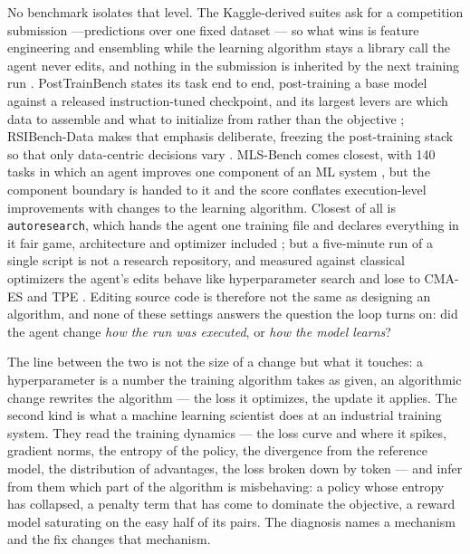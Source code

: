 No benchmark isolates that level. The Kaggle-derived suites ask for a competition submission ---predictions over one fixed dataset --- so what wins is feature engineering and ensembling while the
learning algorithm stays a library call the agent never edits, and nothing in the submission is
inherited by the next training run \citep{chan2024mlebench,qiang2025mledojo}. PostTrainBench states
its task end to end, post-training a base model against a released instruction-tuned checkpoint, and
its largest levers are which data to assemble and what to initialize from rather than the objective
\citep{rank2026posttrainbench}; RSIBench-Data makes that emphasis deliberate, freezing the
post-training stack so that only data-centric decisions vary \citep{meng2026rsibench}. MLS-Bench
comes closest, with 140 tasks in which an agent improves one component of an ML system
\citep{lyu2026mlsbench}, but the component boundary is handed to it and the score conflates execution-level improvements with changes to the learning algorithm.
Closest of all is
\texttt{autoresearch}, which hands the agent one training file and declares everything in it fair
game, architecture and optimizer included \citep{karpathy2026autoresearch}; but a five-minute run of a single script is not a research repository, and measured against classical optimizers the agent's
edits behave like hyperparameter search and lose to CMA-ES and TPE \citep{ferreira2026autoresearch}. Editing source code is therefore not
the same as designing an algorithm, and none of these settings answers the question the loop turns
on: did the agent change \emph{how the run was executed}, or \emph{how the model learns}?

The line between the two is not the size of a change but what it touches: a hyperparameter is a number
the training algorithm takes as given, an algorithmic change rewrites the algorithm --- the loss it
optimizes, the update it applies. 
The second kind is what a machine learning scientist does at an industrial training system. They read the training dynamics --- the loss curve and where it spikes, gradient norms,
the entropy of the policy, the divergence from the reference model, the distribution of advantages,
the loss broken down by token --- and infer from them which part of the algorithm is misbehaving: a
policy whose entropy has collapsed, a penalty term that has come to dominate the objective, a reward
model saturating on the easy half of its pairs. The diagnosis names a mechanism and the fix changes
that mechanism.

